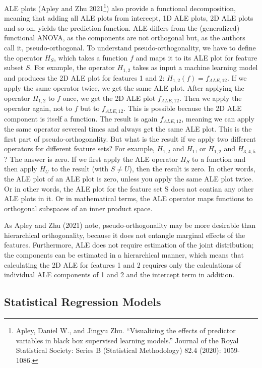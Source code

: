 \documentclass[
  12pt,
]{krantz}
\begin{document}
ALE plots (Apley and Zhu 2021\footnote{Apley, Daniel W., and Jingyu Zhu. ``Visualizing the effects of predictor variables in black box supervised learning models.'' Journal of the Royal Statistical Society: Series B (Statistical Methodology) 82.4 (2020): 1059-1086.}) also provide a functional decomposition, meaning that adding all ALE plots from intercept, 1D ALE plots, 2D ALE plots and so on, yields the prediction function.
ALE differs from the (generalized) functional ANOVA, as the components are not orthogonal but, as the authors call it, pseudo-orthogonal.
To understand pseudo-orthogonality, we have to define the operator \(H_S\), which takes a function \(f\) and maps it to its ALE plot for feature subset \(S\).
For example, the operator \(H_{1,2}\) takes as input a machine learning model and produces the 2D ALE plot for features 1 and 2: \(H_{1,2}(f) = f_{ALE,12}\).
If we apply the same operator twice, we get the same ALE plot.
After applying the operator \(H_{1,2}\) to \(f\) once, we get the 2D ALE plot \(f_{ALE,12}\).
Then we apply the operator again, not to \(f\) but to \(f_{ALE,12}\).
This is possible because the 2D ALE component is itself a function.
The result is again \(f_{ALE,12}\), meaning we can apply the same operator severeal times and always get the same ALE plot.
This is the first part of pseudo-orthogonality.
But what is the result if we apply two different operators for different feature sets?
For example, \(H_{1,2}\) and \(H_{1}\), or \(H_{1,2}\) and \(H_{3,4,5}\)?
The answer is zero.
If we first apply the ALE operator \(H_S\) to a function and then apply \(H_U\) to the result (with \(S \neq U\)), then the result is zero.
In other words, the ALE plot of an ALE plot is zero, unless you apply the same ALE plot twice.
Or in other words, the ALE plot for the feature set S does not contian any other ALE plots in it.
Or in mathematical terms, the ALE operator maps functions to orthogonal subspaces of an inner product space.

As Apley and Zhu (2021) note, pseudo-orthogonality may be more desirable than hierarchical orthogonality, because it does not entangle marginal effects of the features.
Furthermore, ALE does not require estimation of the joint distribution; the components can be estimated in a hierarchical manner, which means that calculating the 2D ALE for features 1 and 2 requires only the calculations of individual ALE components of 1 and 2 and the intercept term in addition.

\hypertarget{statistical-regression-models}{%
\subsection{Statistical Regression Models}\label{statistical-regression-models}}
\end{document}
